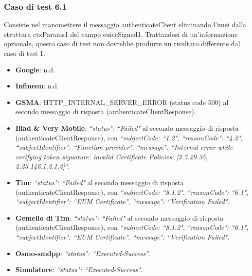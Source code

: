 \documentclass[10pt, oneside]{book}
\begin{document}
\subsubsection{Caso di test 6.1}
Consiste nel manomettere il messaggio authenticateClient eliminando l'imei dalla struttura ctxParams1 del campo euiccSigned1. Trattandosi di un'informazione opzionale, questo caso di test non dovrebbe produrre un risultato differente dal caso di test 1.
\begin{itemize}
\item \textbf{Google}: n.d.
\item \textbf{Infineon}: n.d.
\item \textbf{GSMA}: HTTP\_INTERNAL\_SERVER\_ERROR (status code 500) al secondo messaggio di risposta (authenticateClientResponse).
\item \textbf{Iliad \& Very Mobile}: \textit{``status": ``Failed"} al secondo messaggio di risposta (authenticateClientResponse), con \textit{``subjectCode: ``1.2"}, \textit{``reasonCode": ``4.2"}, \textit{``subjectIdentifier": ``Function provider"}, \textit{``message": ``Internal error while verifying token signature: invalid Certificate Policies: [2.5.29.35, 2.23.146.1.2.1.2]"}.
\item \textbf{Tim}: \textit{``status": ``Failed"} al secondo messaggio di risposta (authenticateClientResponse), con \textit{``subjectCode: ``8.1.2"}, \textit{``reasonCode": ``6.1"}, \textit{``subjectIdentifier": ``EUM Certificate"}, \textit{``message": ``Verification Failed"}.
\item \textbf{Gemello di Tim}: \textit{``status": ``Failed"} al secondo messaggio di risposta (authenticateClientResponse), con \textit{``subjectCode: ``8.1.2"}, \textit{``reasonCode": ``6.1"}, \textit{``subjectIdentifier": ``EUM Certificate"}, \textit{``message": ``Verification Failed"}.
\item \textbf{Osmo-smdpp}: \textit{``status": ``Executed-Success"}.
\item \textbf{Simulatore}: \textit{``status": ``Executed-Success"}.
\end{itemize}
\end{document}
